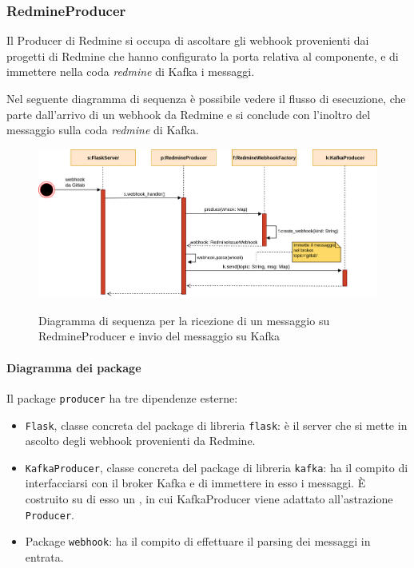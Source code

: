 \subsubsection{RedmineProducer}

Il Producer di Redmine si occupa di ascoltare gli webhook provenienti dai progetti di Redmine che hanno configurato la porta relativa al componente,
e di immettere nella coda \textit{redmine} di Kafka i messaggi.

Nel seguente diagramma di sequenza è possibile vedere il flusso di esecuzione, che parte dall'arrivo di un webhook da Redmine e si conclude con
l'inoltro del messaggio sulla coda \textit{redmine} di Kafka.

\begin{figure}[H]
    \centering
    \includegraphics[width=\textwidth]{img/Producer-MsgRedmine.png}\\
    \caption[Diagramma di sequenza di RedmineProducer]{Diagramma di sequenza per la ricezione di un messaggio su RedmineProducer e invio del messaggio su Kafka}
\end{figure}

\paragraph{Diagramma dei package}

Il package \texttt{producer} ha tre dipendenze esterne:
\begin{itemize}
    \item \texttt{Flask}, classe concreta del package di libreria \texttt{flask}: è il server che si mette in ascolto degli webhook provenienti da Redmine.
    \item \texttt{KafkaProducer}, classe concreta del package di libreria \texttt{kafka}: ha il compito di interfacciarsi con il broker Kafka e di immettere
        in esso i messaggi. È costruito su di esso un , in cui KafkaProducer viene adattato all'astrazione \texttt{Producer}.
    \item Package \texttt{webhook}: ha il compito di effettuare il parsing dei messaggi in entrata.
\end{itemize}

